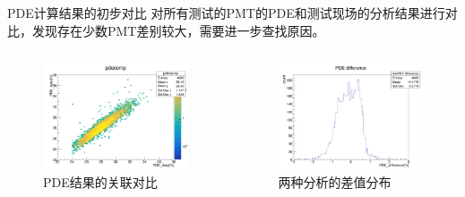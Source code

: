 \documentclass[11pt,compress,xcolor=x11names,UTF8]{beamer}
\begin{document}
\begin{frame}{PDE计算结果的初步对比}
对所有测试的PMT的PDE和测试现场的分析结果进行对比，发现存在少数PMT差别较大，需要进一步查找原因。
\begin{columns}
\begin{column}{.5\textwidth}
\begin{figure}
\centering
\includegraphics[width=\textwidth]{figures/pdecomparation.png} %
\caption{PDE结果的关联对比}
\end{figure}
\end{column}
\begin{column}{.5\textwidth}
\begin{figure}
\centering
\includegraphics[width=\textwidth]{figures/pdedifference.png} %
\caption{两种分析的差值分布}
\end{figure}
\end{column}
\end{columns}
\end{frame}
\end{document}
